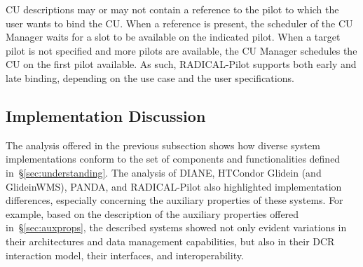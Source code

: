 \documentclass{sig-alternate}
\begin{document}
CU descriptions may or may not contain a reference to the pilot to which the
user wants to bind the CU. When a reference is present, the scheduler of the CU
Manager waits for a slot to be available on the indicated pilot. When a target
pilot is not specified and more pilots are available, the CU Manager schedules
the CU on the first pilot available. As such, RADICAL-Pilot supports both early
and late binding, depending on the use case and the user specifications.

%
\subsection{Implementation Discussion}
\label{sec:context}





The analysis offered in the previous subsection shows how diverse \pilot system
implementations conform to the set of components and functionalities defined
in~\S\ref{sec:understanding}.  The analysis of DIANE, HTCondor Glidein (and
GlideinWMS), PANDA, and RADICAL-Pilot also highlighted implementation
differences, especially concerning the auxiliary properties of these \pilot
systems. For example, based on the description of the auxiliary properties
offered in~\S\ref{sec:auxprops}, the described \pilot systems showed not only
evident variations in their architectures and data management capabilities, but
also in their DCR interaction model, their interfaces, and interoperability.
\end{document}
